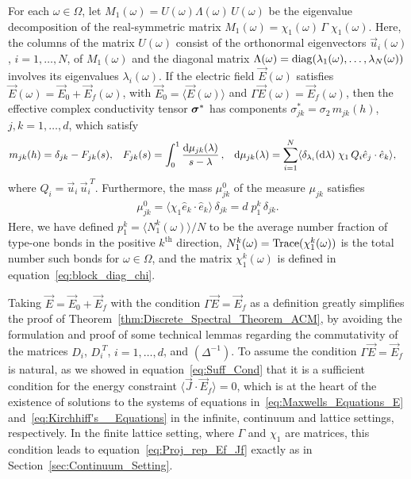 \documentclass{cmslatex}
\newcommand\bsig{\mbox{\boldmath${\sigma}$}}
\begin{document}
\vspace{0.15in}
% 
\begin{theorem}\label{thm:Discrete_Spectral_Theorem_ACM}
  For each $\omega\in\Omega$, let $M_1(\omega)=U(\omega)\Lambda(\omega)\,U(\omega)$ be the eigenvalue
  decomposition of the real-symmetric matrix
  $M_1(\omega)=\chi_1(\omega)\,\Gamma\;\chi_1(\omega)$. Here, the columns of the matrix $U(\omega)$
  consist of the orthonormal eigenvectors $\vec{u}_i(\omega)$, $i=1,\ldots,N$,
  of $M_1(\omega)$ and the diagonal matrix $\Lambda(\omega)={\rm diag}(\lambda_1(\omega),\ldots,\lambda_N(\omega))$
  involves its eigenvalues $\lambda_i(\omega)$. If the electric field
  $\vec{E}(\omega)$ satisfies $\vec{E}(\omega)=\vec{E}_0+\vec{E}_f(\omega)$, with
  $\vec{E}_0=\langle\vec{E}(\omega)\rangle$ and $\Gamma\vec{E}(\omega)=\vec{E}_f(\omega)$, then the
  effective complex conductivity tensor $\bsig^*$ has components
  $\sigma_{jk}^*=\sigma_2\,m_{jk}(h)$, $j,k=1,\ldots,d$,  which satisfy       
%
\begin{align}\label{eq:Stieltjes_F_Discrete}
  &m_{jk}(h)=\delta_{jk}-F_{jk}(s), 
  &&F_{jk}(s)=\int_0^1\frac{{\rm d}\mu_{jk}(\lambda)}{s-\lambda}\,, 
  &&{\rm d}\mu_{jk}(\lambda)=\sum_{i=1}^N\langle \delta_{\lambda_i}({\rm d}\lambda)\;\chi_1\,Q_i\hat{e}_j\cdot\hat{e}_k\rangle,  
\end{align}
%
where $Q_i=\vec{u}_i\,\vec{u}_i^{\;T}$. Furthermore, the mass $\mu_{jk}^0$ of the
measure $\mu_{jk}$ satisfies 
%
\begin{align}\label{eq:Measure_Mass_theorem}
  \mu_{jk}^0=\langle\chi_1\hat{e}_k\cdot\hat{e}_k\rangle\,\delta_{jk}
       =d\;p_1^k\,\delta_{jk}.
\end{align}
%
Here, we have defined $p_1^k=\langle N_1^k(\omega)\rangle/N$ to be the average number
fraction of type-one bonds in the positive $k^{\text{th}}$ direction,
$N_1^k(\omega)={\rm Trace}(\chi_1^k(\omega))$ is the total number such bonds for
$\omega\in\Omega$, and the matrix $\chi_1^k(\omega)$ is defined in
equation~\eqref{eq:block_diag_chi}.   
% 
\end{theorem}


Taking $\vec{E}=\vec{E}_0+\vec{E}_f$ with the 
condition $\Gamma\vec{E}=\vec{E}_f$ as a definition greatly simplifies the
proof of Theorem~\ref{thm:Discrete_Spectral_Theorem_ACM}, by avoiding
the formulation and proof of some technical lemmas regarding the
commutativity of the matrices $D_i$, $D_i^{\;T}$, $i=1,\ldots,d$, and
$(\Delta^{-1})$. To assume the condition $\Gamma\vec{E}=\vec{E}_f$ is natural, 
as we showed in equation~\eqref{eq:Suff_Cond} that it is a 
sufficient condition for the energy constraint
$\langle\vec{J}\cdot\vec{E}_f\rangle=0$, which is at the heart of the existence of
solutions to the systems of equations
in~\eqref{eq:Maxwells_Equations_E}
and~\eqref{eq:Kirchhiff's__Equations} 
in the infinite, continuum and lattice settings, respectively. In the
finite lattice setting, where $\Gamma$ and $\chi_1$ are matrices, this
condition leads to equation~\eqref{eq:Proj_rep_Ef_Jf} exactly as in
Section~\ref{sec:Continuum_Setting}.   
\end{document}
